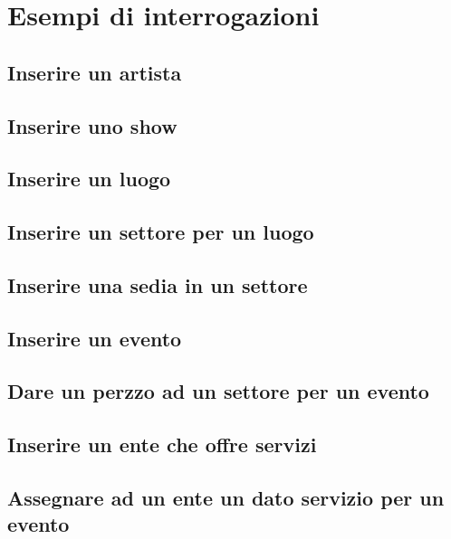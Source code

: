 \documentclass[a4paper,11pt]{article}
\begin{document}
\section{Esempi di interrogazioni}

\subsection{Inserire un artista}


\subsection{Inserire uno show}


\subsection{Inserire un luogo}


\subsection{Inserire un settore per un luogo}


\subsection{Inserire una sedia in un settore}


\subsection{Inserire un evento}


\subsection{Dare un perzzo ad un settore per un evento}


\subsection{Inserire un ente che offre servizi}


\subsection{Assegnare ad un ente un dato servizio per un evento}

\end{document}
